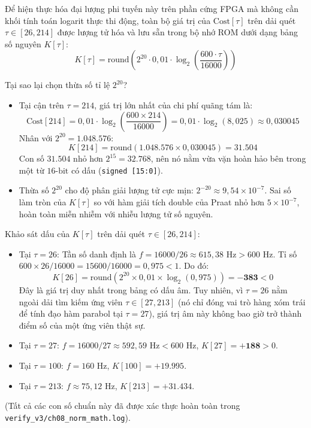 Để hiện thực hóa đại lượng phi tuyến này trên phần cứng FPGA mà không cần khối tính toán logarit thực thi động, toàn bộ giá trị của $\text{Cost}[\tau]$ trên dải quét $\tau \in [26, 214]$ được lượng tử hóa và lưu sẵn trong bộ nhớ ROM dưới dạng bảng số nguyên $K[\tau]$:
\begin{equation}
K[\tau] = \text{round}\left( 2^{20} \cdot 0{,}01 \cdot \log_2\left(\frac{600 \cdot \tau}{16000}\right) \right)
\label{eq:ch08_ktau_def}
\end{equation}

Tại sao lại chọn thừa số tỉ lệ $2^{20}$?
\begin{itemize}[leftmargin=1.5em, itemsep=2pt]
    \item Tại cận trên $\tau = 214$, giá trị lớn nhất của chi phí quãng tám là:
    \begin{equation}
    \text{Cost}[214] = 0{,}01 \cdot \log_2\left(\frac{600 \times 214}{16000}\right) = 0{,}01 \cdot \log_2(8{,}025) \approx 0{,}030045
    \end{equation}
    Nhân với $2^{20} = 1.048.576$:
    \begin{equation}
    K[214] = \text{round}(1.048.576 \times 0{,}030045) = \mathbf{31.504}
    \end{equation}
    Con số $31.504$ nhỏ hơn $2^{15} = 32.768$, nên nó nằm vừa vặn hoàn hảo bên trong một từ $16\text{-bit}$ có dấu (\texttt{signed [15:0]}).
    \item Thừa số $2^{20}$ cho độ phân giải lượng tử cực mịn: $2^{-20} \approx 9{,}54 \times 10^{-7}$. Sai số làm tròn của $K[\tau]$ so với hàm giải tích double của Praat nhỏ hơn $5 \times 10^{-7}$, hoàn toàn miễn nhiễm với nhiễu lượng tử số nguyên.
\end{itemize}

Khảo sát dấu của $K[\tau]$ trên dải quét $\tau \in [26, 214]$:
\begin{itemize}[leftmargin=1.5em, itemsep=2pt]
    \item Tại $\tau = 26$: Tần số danh định là $f = 16000 / 26 \approx 615{,}38\text{ Hz} > 600\text{ Hz}$. Tỉ số $600 \times 26 / 16000 = 15600 / 16000 = 0{,}975 < 1$. Do đó:
    \begin{equation}
    K[26] = \text{round}(2^{20} \times 0{,}01 \times \log_2(0{,}975)) = \mathbf{-383} < 0
    \end{equation}
    Đây là giá trị duy nhất trong bảng có dấu âm. Tuy nhiên, vì $\tau = 26$ nằm ngoài dải tìm kiếm ứng viên $\tau \in [27, 213]$ (nó chỉ đóng vai trò hàng xóm trái để tính đạo hàm parabol tại $\tau = 27$), giá trị âm này không bao giờ trở thành điểm số của một ứng viên thật sự.
    \item Tại $\tau = 27$: $f = 16000 / 27 \approx 592{,}59\text{ Hz} < 600\text{ Hz}$, $K[27] = \mathbf{+188} > 0$.
    \item Tại $\tau = 100$: $f = 160\text{ Hz}$, $K[100] = \mathbf{+19.995}$.
    \item Tại $\tau = 213$: $f \approx 75{,}12\text{ Hz}$, $K[213] = \mathbf{+31.434}$.
\end{itemize}
(Tất cả các con số chuẩn này đã được xác thực hoàn toàn trong \texttt{verify\_v3/ch08\_norm\_math.log}).


